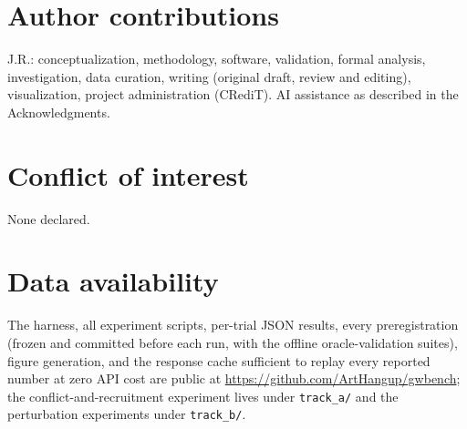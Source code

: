 \documentclass[11pt]{article}
\begin{document}
\section*{Author contributions}

J.R.: conceptualization, methodology, software, validation, formal analysis,
investigation, data curation, writing (original draft, review and editing),
visualization, project administration (CRediT). AI assistance as described in
the Acknowledgments.

\section*{Conflict of interest}

None declared.

\section*{Data availability}

The harness, all experiment scripts, per-trial JSON results, every
preregistration (frozen and committed before each run, with the offline
oracle-validation suites), figure generation, and the response cache
sufficient to replay every reported number at zero API cost are public at
\url{https://github.com/ArtHangup/gwbench}; the conflict-and-recruitment
experiment lives under \texttt{track\_a/} and the perturbation experiments
under \texttt{track\_b/}.
\end{document}

